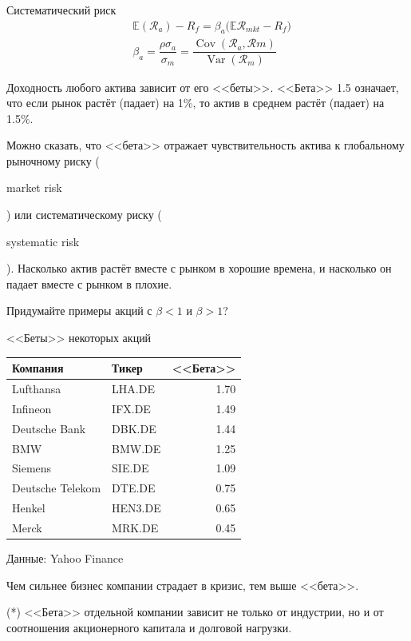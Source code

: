 \documentclass{beamer}
\newcommand{\en}[1]{\begin{otherlanguage}{english}#1\end{otherlanguage}}
\begin{document}
\begin{frame}{Систематический риск}
\justify
\begin{align*}
&\mathbb{E}(\mathcal{R}_{a}) - R_{f} =
\beta_{a}\big(
	\mathbb{E}\mathcal{R}_{mkt} - R_{f}		
\big) \\
&\beta_a = \dfrac{\rho\sigma_a}{\sigma_m} =
\dfrac{\operatorname{Cov}(\mathcal{R}_a, \mathcal{R}m)}
{\operatorname{Var}(\mathcal{R}_m)}
\end{align*}

\justify
Доходность любого актива зависит от его <<беты>>. <<Бета>> 1.5 означает, что 
если рынок растёт (падает) на 1\%, то актив в среднем растёт (падает) на 1.5\%. 

\justify
Можно сказать, что <<бета>> отражает чувствительность актива к глобальному 
рыночному риску (\en{market risk}) или систематическому риску (\en{systematic 
risk}). Насколько актив растёт вместе с рынком в хорошие времена, и насколько 
он падает вместе с рынком в плохие.

\justify
Придумайте примеры акций с $\beta<1$ и $\beta>1$?
\end{frame}



\begin{frame}{<<Беты>> некоторых акций}
\centering
\begin{tabular}{l|l|r}
Компания         & Тикер   & <<Бета>> \\ \hline
Lufthansa        & LHA.DE  & 1.70     \\
Infineon         & IFX.DE  & 1.49     \\
Deutsche Bank    & DBK.DE  & 1.44     \\
BMW              & BMW.DE  & 1.25     \\
Siemens          & SIE.DE  & 1.09     \\
Deutsche Telekom & DTE.DE  & 0.75     \\
Henkel           & HEN3.DE & 0.65    \\
Merck            & MRK.DE  & 0.45     
\end{tabular}

\justify
\centering
{\scriptsize Данные: Yahoo Finance}

\justify
Чем сильнее бизнес компании страдает в кризис, тем выше <<бета>>.

\justify
(*) <<Бета>> отдельной компании зависит не только от индустрии, но и от 
соотношения акционерного капитала и долговой нагрузки.
\end{frame}
\end{document}
